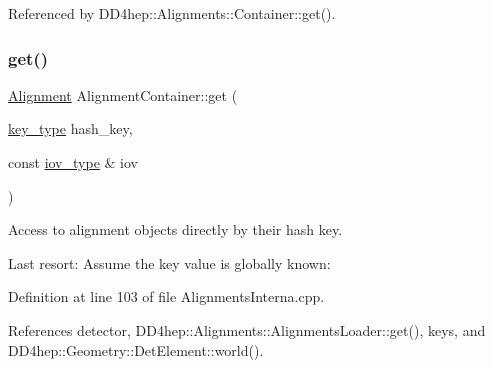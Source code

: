 Referenced by D\+D4hep\+::\+Alignments\+::\+Container\+::get().

\hypertarget{class_d_d4hep_1_1_alignments_1_1_interna_1_1_alignment_container_af87ee43a853d77f00ba6ed6902f3b717}{}\label{class_d_d4hep_1_1_alignments_1_1_interna_1_1_alignment_container_af87ee43a853d77f00ba6ed6902f3b717} 
\subsubsection{\texorpdfstring{get()}{get()}\hspace{0.1cm}{\footnotesize\ttfamily [2/4]}}
{\footnotesize\ttfamily \hyperlink{class_d_d4hep_1_1_alignments_1_1_alignment}{Alignment} Alignment\+Container\+::get (\begin{DoxyParamCaption}\item[{\hyperlink{class_d_d4hep_1_1_alignments_1_1_interna_1_1_alignment_container_a7395f0e25d9e524d2a2bd7df0f4364e6}{key\+\_\+type}}]{hash\+\_\+key,  }\item[{const \hyperlink{class_d_d4hep_1_1_alignments_1_1_interna_1_1_alignment_container_a99b2a8d269ecefcf1b59269ad94e75e3}{iov\+\_\+type} \&}]{iov }\end{DoxyParamCaption})}



Access to alignment objects directly by their hash key. 

Last resort\+: Assume the key value is globally known\+: 

Definition at line 103 of file Alignments\+Interna.\+cpp.



References detector, D\+D4hep\+::\+Alignments\+::\+Alignments\+Loader\+::get(), keys, and D\+D4hep\+::\+Geometry\+::\+Det\+Element\+::world().

\hypertarget{class_d_d4hep_1_1_alignments_1_1_interna_1_1_alignment_container_aaeb5bcf42da9c3e79911544e4bb512d9}{}\label{class_d_d4hep_1_1_alignments_1_1_interna_1_1_alignment_container_aaeb5bcf42da9c3e79911544e4bb512d9} 
